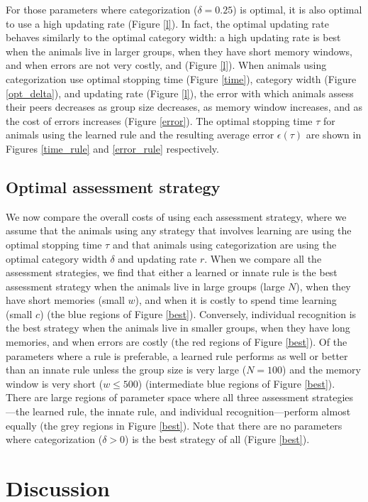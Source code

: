 For those parameters where categorization ($\delta=0.25$) is optimal, it is also optimal to use a high updating rate (Figure \ref{l}). In fact, the optimal updating rate behaves similarly to the optimal category width: a high updating rate is best when the animals live in larger groups, when they have short memory windows, and when errors are not very costly, and  (Figure \ref{l}). When animals using categorization use optimal stopping time (Figure \ref{time}), category width (Figure \ref{opt_delta}), and updating rate (Figure \ref{l}), the error with which animals assess their peers decreases as group size decreases, as memory window increases, and as the cost of errors increases (Figure \ref{error}). The optimal stopping time $\tau$ for animals using the learned rule and the resulting average error $\epsilon(\tau)$ are shown in Figures \ref{time_rule} and \ref{error_rule} respectively.


\subsection*{Optimal assessment strategy}
We now compare the overall costs of using each assessment strategy, where we assume that the animals using any strategy that involves learning are using the optimal stopping time $\tau$ and that animals using categorization are using the optimal category width $\delta$ and updating rate $r$. When we compare all the assessment strategies, we find that either a learned or innate rule is the best assessment strategy when the animals live in large groups (large $N$), when they have short memories (small $w$), and when it is costly to spend time learning (small $c$) (the blue regions of Figure \ref{best}). Conversely, individual recognition is the best strategy when the animals live in smaller groups, when they have long memories, and when errors are costly (the red regions of Figure \ref{best}). Of the parameters where a rule is preferable, a learned rule performs as well or better than an innate rule unless the group size is very large ($N=100$) and the memory window is very short ($w\leq500$) (intermediate blue regions of Figure \ref{best}). There are large regions of parameter space where all three assessment strategies---the learned rule, the innate rule, and individual recognition---perform almost equally (the grey regions in Figure \ref{best}). Note that there are no parameters where categorization ($\delta>0$) is the best strategy of all (Figure \ref{best}).  

\section*{Discussion}

